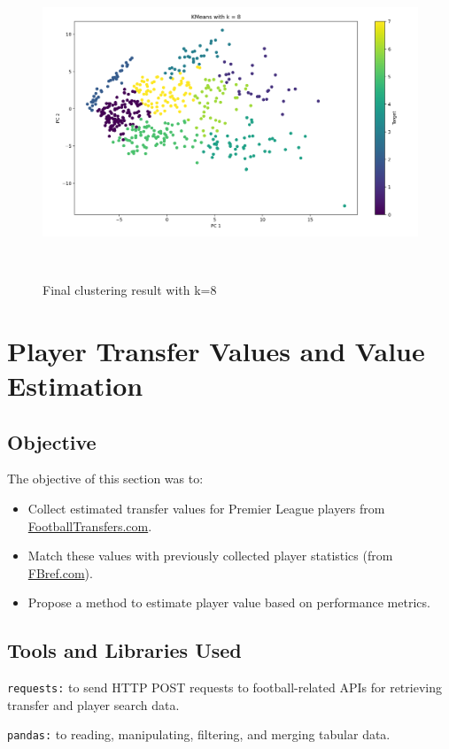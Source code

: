 \documentclass[12pt,a4paper]{report}
\begin{document}
\begin{figure}[H]
    \centering
    \includegraphics[width=6.088542213473316in,height=3.661352799650044in]{media/image8.png}
    \caption{Final clustering result with k=8}
\end{figure}

\chapter{Player Transfer Values and Value Estimation}
\section{Objective}
The objective of this section was to:
\begin{itemize}
    \item Collect estimated transfer values for Premier League players from \href{https://footballtransfers.com}{FootballTransfers.com}.
    \item Match these values with previously collected player statistics (from \href{https://fbref.com/en/}{FBref.com}).
    \item Propose a method to estimate player value based on performance metrics.
\end{itemize}

\section{Tools and Libraries Used}
   \texttt{requests:} to send HTTP POST requests to football-related APIs for retrieving transfer and player search data.
   
   \texttt{pandas:} to reading, manipulating, filtering, and merging tabular data.
   
\end{document}

